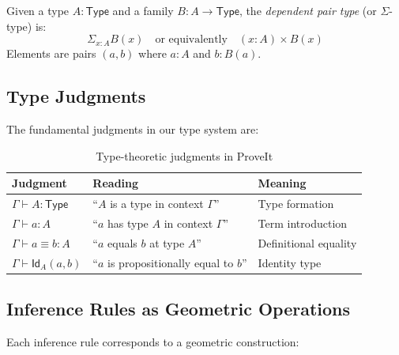 \documentclass[11pt,a4paper,twoside]{report}
\newcommand{\Type}{\mathsf{Type}}
\newcommand{\Sigma}[2]{\sum_{#1} #2}
\newcommand{\Id}[3]{\mathsf{Id}_{#1}(#2, #3)}
\newcommand{\proves}{\vdash}
\newcommand{\ctx}{\Gamma}
\begin{document}
\begin{definition}
\label{def:sigma-type}
Given a type $A : \Type$ and a family $B : A \to \Type$, the \emph{dependent pair type} (or $\Sigma$-type) is:
\[
    \Sigma_{x : A} B(x) \quad \text{or equivalently} \quad (x : A) \times B(x)
\]
Elements are pairs $(a, b)$ where $a : A$ and $b : B(a)$.
\end{definition}

\subsection{Type Judgments}

The fundamental judgments in our type system are:

\begin{table}[htbp]
\centering
\caption{Type-theoretic judgments in ProveIt}
\label{tab:judgments}
\begin{tabular}{@{}lll@{}}
\toprule
\textbf{Judgment} & \textbf{Reading} & \textbf{Meaning} \\
\midrule
$\ctx \proves A : \Type$ & ``$A$ is a type in context $\ctx$'' & Type formation \\
$\ctx \proves a : A$ & ``$a$ has type $A$ in context $\ctx$'' & Term introduction \\
$\ctx \proves a \equiv b : A$ & ``$a$ equals $b$ at type $A$'' & Definitional equality \\
$\ctx \proves \Id{A}{a}{b}$ & ``$a$ is propositionally equal to $b$'' & Identity type \\
\bottomrule
\end{tabular}
\end{table}

\subsection{Inference Rules as Geometric Operations}

Each inference rule corresponds to a geometric construction:
\end{document}

